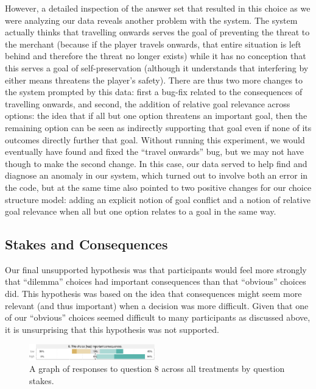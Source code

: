 However, a detailed inspection of the answer set that resulted in this choice as we were analyzing our data reveals another problem with the system.
%
The system actually thinks that travelling onwards serves the goal of preventing the threat to the merchant (because if the player travels onwards, that entire situation is left behind and therefore the threat no longer exists) while it has no conception that this serves a goal of self-preservation (although it understands that interfering by either means threatens the player's safety).
%
There are thus two more changes to the system prompted by this data: first a bug-fix related to the consequences of travelling onwards, and second, the addition of relative goal relevance across options: the idea that if all but one option threatens an important goal, then the remaining option can be seen as indirectly supporting that goal even if none of its outcomes directly further that goal.
%
Without running this experiment, we would eventually have found and fixed the ``travel onwards'' bug, but we may not have though to make the second change.
%
In this case, our data served to help find and diagnose an anomaly in our system, which turned out to involve both an error in the code, but at the same time also pointed to two positive changes for our choice structure model: adding an explicit notion of goal conflict and a notion of relative goal relevance when all but one option relates to a goal in the same way.

\subsection{Stakes and Consequences}

Our final unsupported hypothesis was that participants would feel more strongly that ``dilemma'' choices had important consequences than that ``obvious'' choices did.
%
This hypothesis was based on the idea that consequences might seem more relevant (and thus important) when a decision was more difficult.
%
Given that one of our ``obvious'' choices seemed difficult to many participants as discussed above, it is unsurprising that this hypothesis was not supported.


\begin{figure}[h]
  \hspace*{-0.2em}\includegraphics[width=0.485\textwidth]{fig/stakes-q8.pdf}
  \caption{A graph of responses to question 8 across all treatments by question stakes.}
  \label{fig:stakesq8}
\end{figure}


